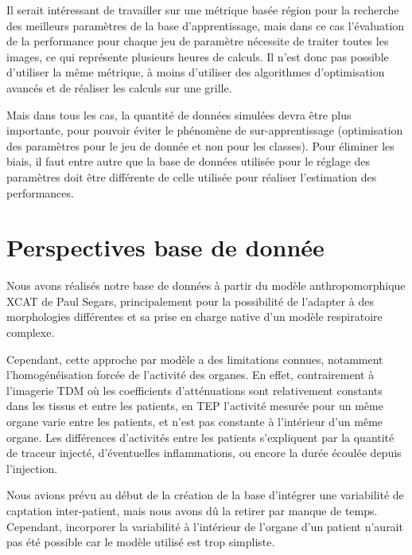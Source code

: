 Il serait intéressant de travailler sur une métrique basée région pour la recherche des meilleurs paramètres de la base d'apprentissage, mais dans ce cas l'évaluation de la performance pour chaque jeu de paramètre nécessite de traiter toutes les images, ce qui représente plusieurs heures de calculs. Il n'est donc pas possible d'utiliser la même métrique, à moins d'utiliser des algorithmes d'optimisation avancés et de réaliser les calculs sur une grille.

Mais dans tous les cas, la quantité de données simulées devra être plus importante, pour pouvoir éviter le phénomène de sur-apprentissage (optimisation des paramètres pour le jeu de donnée et non pour les classes). Pour éliminer les biais, il faut entre autre que la base de données utilisée pour le réglage des paramètres doit être différente de celle utilisée pour réaliser l'estimation des performances.


\section{Perspectives base de donnée}

Nous avons réalisés notre base de données à partir du modèle anthropomorphique XCAT de Paul Segars, principalement pour la possibilité de l'adapter à des morphologies différentes et sa prise en charge native d'un modèle respiratoire complexe.

Cependant, cette approche par modèle a des limitations connues, notamment l'homogénéisation forcée de l'activité des organes. En effet, contrairement à l'imagerie TDM où les coefficients d'atténuations sont relativement constants dans les tissus et entre les patients, en TEP l'activité mesurée pour un même organe varie entre les patients, et n'est pas constante à l'intérieur d'un même organe. Les différences d'activités entre les patients s'expliquent par la quantité de traceur injecté, d'éventuelles inflammations, ou encore la durée écoulée depuis l'injection. 

Nous avions prévu au début de la création de la base d'intégrer une variabilité de captation inter-patient, mais nous avons dû la retirer par manque de temps. Cependant, incorporer la variabilité à l'intérieur de l'organe d'un patient n'aurait pas été possible car le modèle utilisé est trop simpliste. 

